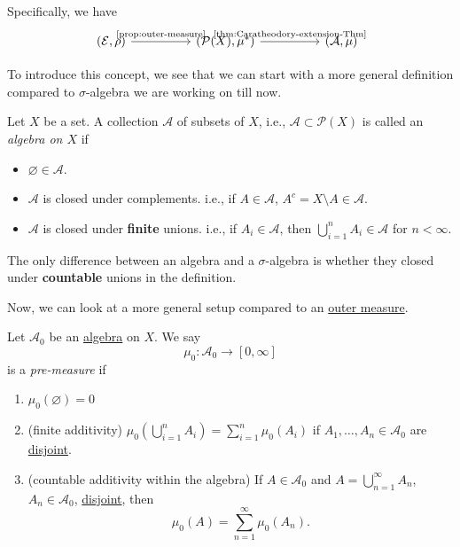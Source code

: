 Specifically, we have
\[
	\begin{tikzcd}
		(\mathcal{E}, \rho) \ar[rr, "\text{\autoref{prop:outer-measure}}"] && (\mathcal{P}(X), \mu^{*} ) \ar[rr, "\text{\autoref{thm:Caratheodory-extension-Thm}}"] && (\mathcal{A} , \mu)
	\end{tikzcd}
\]

\par To introduce this concept, we see that we can start with a more general definition compared to \(\sigma\)-algebra we are working on till now.
\begin{definition}[Algebra]\label{def:algebra}
	Let \(X\) be a set. A collection \(\mathcal{A} \) of subsets of \(X\), i.e., \(\mathcal{A}\subset \mathcal{P} (X) \) is called an \emph{algebra on \(X\)} if
	\begin{itemize}
		\item \(\varnothing \in \mathcal{A} \).
		\item \(\mathcal{A} \) is closed under complements. i.e., if \(A\in \mathcal{A} \), \(A^c = X\setminus A\in \mathcal{A} \).
		\item \(\mathcal{A} \) is closed under \textbf{finite} unions. i.e., if \(A_i\in \mathcal{A} \), then \(\bigcup\limits_{i=1}^{n} A_{i}\in \mathcal{A} \) for \(n<\infty \).
	\end{itemize}
\end{definition}
\begin{remark}
	The only difference between an algebra and a \(\sigma\)-algebra is whether they closed under \textbf{countable} unions in the definition.
\end{remark}

\par Now, we can look at a more general setup compared to an \hyperref[def:outer-measure]{outer measure}.
\begin{definition}\label{def:pre-measure}
	Let \(\mathcal{A} _0\) be an \hyperref[def:algebra]{algebra} on \(X\). We say
	\[
		\mu_0 \colon \mathcal{A} _0\to [0, \infty ]
	\]
	is a \emph{pre-measure} if
	\begin{enumerate}
		\item\label{def:pre-measure-empty-measure}\(\mu_0(\varnothing ) = 0\)
		\item\label{def:pre-measure-finite-additivity}(finite additivity) \(\mu_0\left(\bigcup\limits_{i=1}^{n} A_{i}\right) = \sum\limits_{i=1}^{n} \mu_0(A_{i})\) if
		\(A_1, \ldots , A_n\in \mathcal{A} _0 \) are \underline{disjoint}.
		\item\label{def:pre-measure-countable-additivity-within-the-algebra}(countable additivity within the algebra) If \(A\in\mathcal{A} _0\) and \(A = \bigcup\limits_{n=1}^{\infty} A_{n}\),
		\(A_n\in\mathcal{A} _0\), \underline{disjoint}, then
		\[
			\mu_0(A) = \sum\limits_{n=1}^{\infty} \mu_0(A_{n}).
		\]
	\end{enumerate}
\end{definition}

